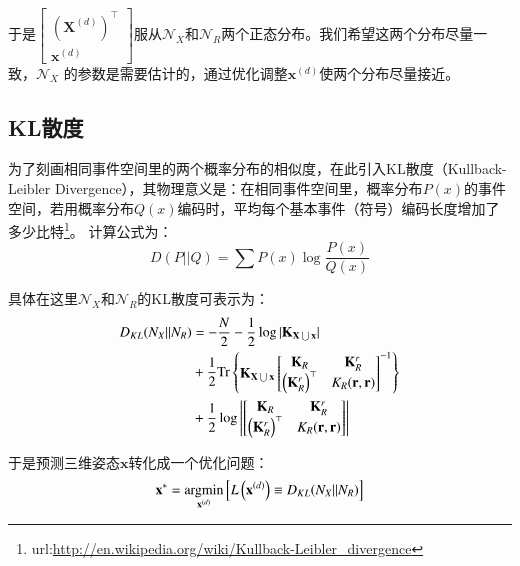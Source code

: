 于是$\begin{bmatrix} {\left(\mathbf{X}^{(d)}\right)}^\top \\ \mathbf{x}^{(d)} \end{bmatrix}$服从$\mathcal{N}_X$和$\mathcal{N}_R$两个正态分布。我们希望这两个分布尽量一致，$\mathcal{N}_X$ 的参数是需要估计的，通过优化调整$\mathbf{x}^{(d)}$使两个分布尽量接近。

\subsection{KL散度}
为了刻画相同事件空间里的两个概率分布的相似度，在此引入KL散度（Kullback-Leibler Divergence），其物理意义是：在相同事件空间里，概率分布$P(x)$的事件空间，若用概率分布$Q(x)$编码时，平均每个基本事件（符号）编码长度增加了多少比特\footnote{url:\url{http://en.wikipedia.org/wiki/Kullback-Leibler_divergence}}。 计算公式为：
\begin{equation}
  D(P||Q)=\sum P(x)\log \frac{P(x)}{Q(x)}
\end{equation}

具体在这里$\mathcal{N}_X$和$\mathcal{N}_R$的KL散度可表示为：
\begin{align}
 D_{KL}(N_X||N_R) &= -\frac{N}{2}-\frac{1}{2}\log|\mathbf{K}_{\mathbf{X}\bigcup \mathbf{x}}| \notag\\
                  &+ \frac{1}{2}\textmd{Tr} \begin{Bmatrix} \mathbf{K}_{\mathbf{X}\bigcup \mathbf{x}} \begin{bmatrix} \mathbf{K}_R & \mathbf{K}_R^r \notag\\ {\left(\mathbf{K}_R^r\right)}^\top & K_R(\mathbf{r},\mathbf{r}) \end{bmatrix} ^{-1} \end{Bmatrix}\\
                  &+ \frac{1}{2}\log \begin{vmatrix}\begin{bmatrix} \mathbf{K}_R & \mathbf{K}_R^r \\ {\left(\mathbf{K}_R^r\right)}^\top & K_R(\mathbf{r},\mathbf{r}) \end{bmatrix}\end{vmatrix}\label{eqn:KLorg}
\end{align}

于是预测三维姿态$\mathbf{x}$转化成一个优化问题：
\begin{equation}
  \mathbf{x}^\ast  = \underset{\mathbf{x}^{(d)}}{\textmd{argmin}} \left[L\left(\mathbf{x}^{(d)}\right)\equiv D_{KL}(N_X||N_R)\right]
\end{equation}

